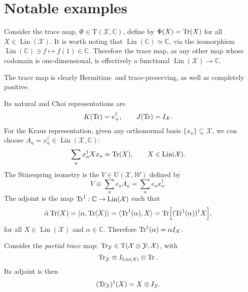 \documentclass[12pt]{report}
\newcommand{\CC}{\mathbb{C}}
\newcommand{\calY}{{\mathcal{Y}}}
\newcommand{\calW}{{\mathcal{W}}}
\newcommand{\calX}{{\mathcal{X}}}
\newcommand{\rmT}{{\mathrm{T}}}
\newcommand{\rmU}{{\mathrm{U}}}
\DeclareMathOperator{\Lin}{Lin}
\begin{document}
\section{Notable examples}

\begin{example}
	Consider the trace map, $\Phi\in\rmT(\calX,\CC)$, define by $\Phi(X)=\Tr(X)$ for all $X\in\Lin(\calX)$.
	It is worth noting that $\Lin(\CC)\simeq \CC$, via the isomorphism
	$\Lin(\CC)\ni f\mapsto f(1)\in\CC$.
	Therefore the trace map, as any other map whose codomain is one-dimensional, is effectively a functional $\Lin(\calX)\to\CC$.

	The trace map is clearly Hermitian- and trace-preserving, as well as completely positive.

	Its natural and Choi representations are
	\begin{equation}
		K(\Tr) = e_+^\dagger,
		\qquad J(\Tr) = I_{\calX}.
	\end{equation}
	For the Kraus representation, given any orthonormal basis $\{x_a\}\subseteq\calX$, we can choose $A_a=x_a^\dagger\in\Lin(\calX,\CC)$:
	\begin{equation}
		\sum_a x_a^\dagger X x_a = \Tr(X),
		\qquad X\in\Lin(\calX).
	\end{equation}
	The Stinespring isometry is the $V\in\rmU(\calX,\calW)$ defined by
	\begin{equation}
		V \equiv \sum_a e_a A_a = \sum_a e_a x_a^\dagger.
	\end{equation}
	The adjoint is the map $\Tr^\dagger:\CC\to\Lin(\calX)$ such that
	\begin{equation}
		\bar\alpha \Tr(X)
		= \langle \alpha,\Tr(X)\rangle
		= \langle \Tr^\dagger(\alpha), X\rangle
		= \Tr[(\Tr^\dagger(\alpha))^\dagger X],
	\end{equation}
	for all $X\in\Lin(\calX)$ and $\alpha\in\CC$.
	Therefore $\Tr^\dagger(\alpha)=\alpha I_\calX$.
\end{example}

\begin{example}
	Consider the \emph{partial trace} map:
	$\Tr_\calY\in\rmT(\calX\otimes\calY,\calX)$, with
	\begin{equation}
		\Tr_\calY \equiv I_{\Lin(\calX)}\otimes\Tr.
	\end{equation}
	Its adjoint is then
	\begin{equation}
		(\Tr_\calY)^\dagger(X) = X\otimes I_\calY.
	\end{equation}
\end{example}
\end{document}
